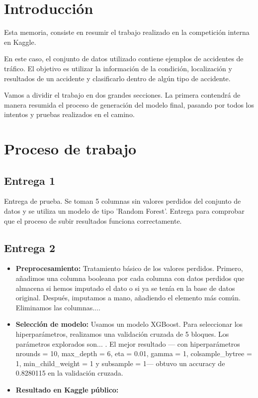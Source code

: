 \section{Introducción}

Esta memoria, consiste en resumir el trabajo realizado en la competición interna en Kaggle. 

En este caso, el conjunto de datos utilizado contiene ejemplos de accidentes de tráfico. El objetivo es utilizar la información de la condición, localización y resultados de un accidente y clasificarlo dentro de algún tipo de accidente.

Vamos a dividir el trabajo en dos grandes secciones. La primera contendrá de manera resumida el proceso de generación del modelo final, pasando por todos los intentos y pruebas realizados en el camino.
\section{Proceso de trabajo}

\subsection{Entrega 1}

Entrega de prueba. Se toman 5 columnas sin valores perdidos del conjunto de datos y se utiliza un modelo de tipo 'Random Forest'. Entrega para comprobar que el proceso de subir resultados funciona correctamente.

\subsection{Entrega 2}
\begin{itemize}
\item \textbf{Preprocesamiento:} Tratamiento básico de los valores perdidos. Primero, añadimos una columna booleana por cada columna con datos perdidos que almacena si hemos imputado el dato o si ya se tenía en la base de datos original. Después, imputamos a mano, añadiendo el elemento más común. Eliminamos las columnas.... 
\item \textbf{Selección de modelo:} Usamos un modelo XGBoost. Para seleccionar los hiperparámetros, realizamos una validación cruzada de 5 bloques. Los parámetros explorados son... . El mejor resultado --- con hiperparámetros nrounds = 10, max_depth = 6, eta = 0.01, gamma = 1, colsample_bytree =
 1, min_child_weight = 1 y subsample = 1--- obtuvo un accuracy de 0.8280115 en la validación cruzada.
\item \textbf{Resultado en Kaggle público:}
\end{itemize}


